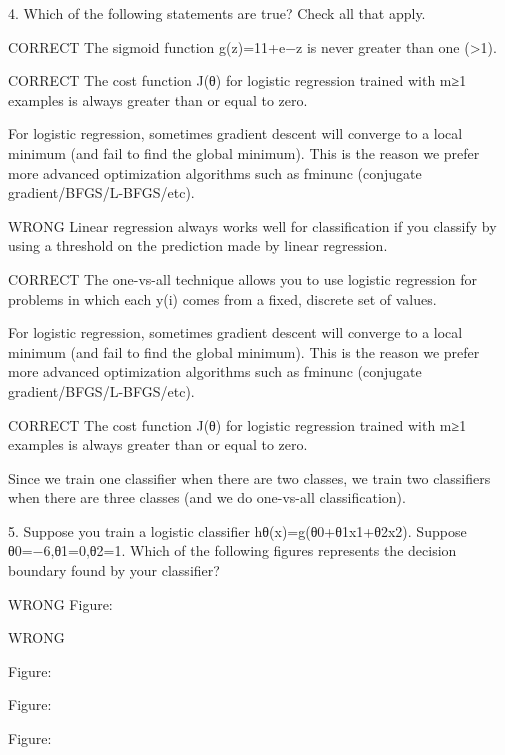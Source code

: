 4. 
Which of the following statements are true? Check all that apply.

CORRECT The sigmoid function g(z)=11+e−z is never greater than one (>1).

CORRECT The cost function J(θ) for logistic regression trained with m≥1 examples is always greater than or equal to zero.

For logistic regression, sometimes gradient descent will converge to a local minimum (and fail to find the global minimum). This is the reason we prefer more advanced optimization algorithms such as fminunc (conjugate gradient/BFGS/L-BFGS/etc).

WRONG Linear regression always works well for classification if you classify by using a threshold on the prediction made by linear regression.


CORRECT The one-vs-all technique allows you to use logistic regression for problems in which each y(i) comes from a fixed, discrete set of values.

For logistic regression, sometimes gradient descent will converge to a local minimum (and fail to find the global minimum). This is the reason we prefer more advanced optimization algorithms such as fminunc (conjugate gradient/BFGS/L-BFGS/etc).

CORRECT The cost function J(θ) for logistic regression trained with m≥1 examples is always greater than or equal to zero.

Since we train one classifier when there are two classes, we train two classifiers when there are three classes (and we do one-vs-all classification).


5. 
Suppose you train a logistic classifier hθ(x)=g(θ0+θ1x1+θ2x2). Suppose θ0=−6,θ1=0,θ2=1. Which of the following figures represents the decision boundary found by your classifier?

WRONG %
Figure:


WRONG

Figure:



Figure:



Figure:



